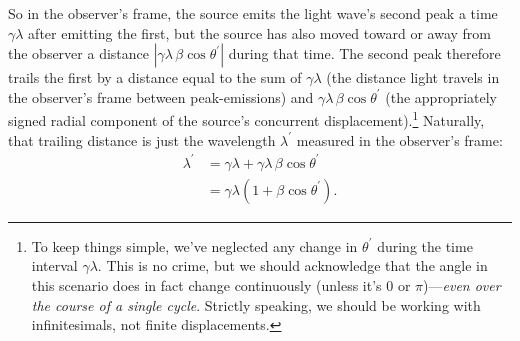\documentclass[12pt]{article}
\begin{document}
So in the observer's frame, the source emits the light wave's second peak a time $\gamma \lambda$ after emitting the first, but the source has also moved toward or away from the observer a distance $| \gamma \lambda \, \beta \cos \theta^\prime |$ during that time. The second peak therefore trails the first by a distance equal to the sum of $\gamma \lambda$ (the distance light travels in the observer's frame between peak-emissions) and $\gamma \lambda \, \beta \cos \theta^\prime$ (the appropriately signed radial component of the source's concurrent displacement).\footnote{To keep things simple, we've neglected any change in $\theta^\prime$ during the time interval $\gamma \lambda$. This is no crime, but we should acknowledge that the angle in this scenario does in fact change continuously (unless it's $0$ or $\pi$)---\emph{even over the course of a single cycle}. Strictly speaking, we should be working with infinitesimals, not finite displacements.} Naturally, that trailing distance is just the wavelength $\lambda^\prime$ measured in the observer's frame:
\begin{equation*}
\begin{aligned}
\lambda^\prime &= \gamma \lambda + \gamma \lambda \, \beta \cos \theta^\prime \\
&= \gamma \lambda \left( 1 + \beta \cos \theta^\prime \right).
\end{aligned}
\end{equation*}
\end{document}
